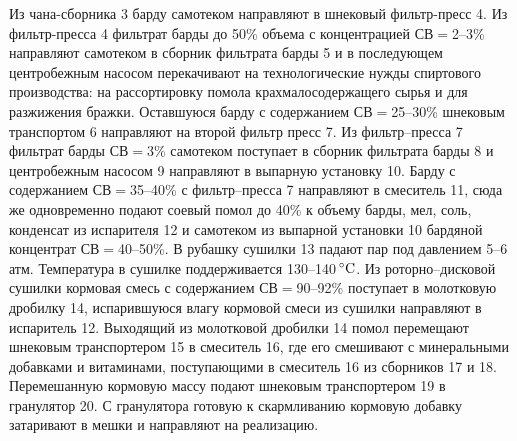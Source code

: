 Из чана-сборника 3 барду самотеком направляют в шнековый фильтр-пресс 4.
Из фильтр-пресса 4 фильтрат барды до 50\% объема с концентрацией СВ\(=\)2--3\% направляют самотеком в сборник фильтрата барды 5 и в последующем центробежным насосом перекачивают на технологические нужды спиртового производства: на рассортировку помола крахмалосодержащего сырья и для разжижения бражки.
Оставшуюся барду с содержанием СВ\(=\)25--30\% шнековым транспортом 6 направляют на второй фильтр пресс 7. 
Из фильтр--пресса 7 фильтрат барды СВ\(=\)3\% самотеком поступает в сборник фильтрата барды 8 и центробежным насосом 9 направляют в выпарную установку 10.
Барду с содержанием СВ\(=\)35--40\% с фильтр--пресса 7 направляют в смеситель 11, сюда же одновременно подают соевый помол до 40\% к объему барды, мел, соль, конденсат из испарителя 12 и самотеком из выпарной установки 10 бардяной концентрат СВ\(=\)40--50\%.
В рубашку сушилки 13 падают пар под давлением 5--6 атм.
Температура в сушилке поддерживается 130--140\(\,^{\circ}\mathrm{C}\). 
Из роторно--дисковой сушилки кормовая смесь с содержанием СВ\(=\)90--92\% поступает в молотковую дробилку 14, испарившуюся влагу кормовой смеси из сушилки направляют в испаритель 12.
Выходящий из молотковой дробилки 14 помол перемещают шнековым транспортером 15 в смеситель 16, где его смешивают с минеральными добавками и витаминами, поступающими в смеситель 16 из сборников 17 и 18.
Перемешанную кормовую массу подают шнековым транспортером 19 в гранулятор 20.
С гранулятора готовую к скармливанию кормовую добавку затаривают в мешки и направляют на реализацию.

